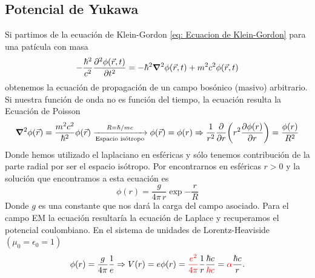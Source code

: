 \subsection{Potencial de Yukawa}
Si partimos de la ecuación de Klein-Gordon \ref{eq: Ecuacion de Klein-Gordon} para una patícula con masa
\begin{equation}
    -\frac{\hbar^2}{c^2} \pdv[2]{\phi(\vec{r},t)}{t}=-\hbar^2\grad^2\phi(\vec{r},t)+m^2c^2\phi(\vec{r},t)
\end{equation}
obtenemos la ecuación de propagación de un campo bosónico (masivo) arbitrario. Si nuestra función de onda no es función del tiempo, la ecuación resulta la Ecuación de Poisson
\begin{equation}
    \grad^2\phi(\vec{r})=\frac{m^2c^2}{\hbar^2} \phi(\vec{r}) \xrightarrow[\text{Espacio isótropo}]{R=\hbar/mc} \phi(\vec{r})=\phi(r) \Rightarrow \frac{1}{r^2} \pdv{}{r}\qty(r^2\pdv{\phi(r)}{r})=\frac{\phi(r)}{R^2}
\end{equation}
Donde hemos utilizado el laplaciano en esféricas y sólo tenemos contribución de la parte radial por ser el espacio isótropo. Por encontrarnos en esféricas $r>0$ y la solución que encontramos a esta ecuación es 
\begin{equation}
    \phi(r)=\frac{g}{4\pi\,r} \exp{-\dfrac{r}{R}}
    \label{eq: potencial de yukawa}
\end{equation}
Donde $g$ es una constante que nos dará la carga del campo asociado. Para el campo EM la ecuación resultaría la ecuación de Laplace y recuperamos el potencial coulombiano. En el sistema de unidades de Lorentz-Heaviside $(\mu_0=\epsilon_0=1)$
\begin{equation}
    \phi(r)=\frac{g}{4\pi} \frac{1}{e} \Rightarrow V(r)=e \phi(r)=\textcolor{red}{\frac{e^2}{4\pi}}\frac{1}{r} \frac{\hbar c}{\textcolor{red}{\hbar c}}=\textcolor{red}{\alpha} \frac{\hbar c}{r}.
\end{equation}
\clearpage

